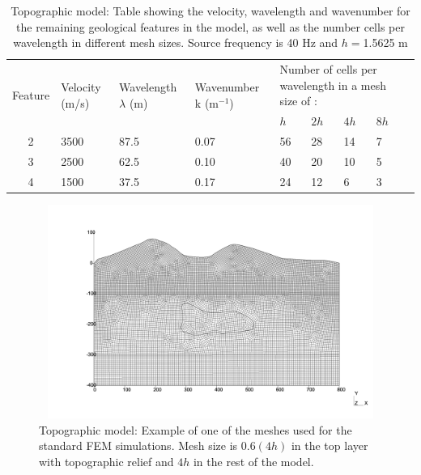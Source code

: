\begin{table}[h!]
\footnotesize
\centering
    \begin{tabular}{|c|m{1.5cm}|m{2cm}|m{2cm}|m{1cm}| m{0.8cm}|m{0.8cm}|m{0.8cm}|m{0.8cm}|}
      \hline
      \multirow{2}{*}{Feature} &
      \multirow{2}{1.5cm}{Velocity (m/s)} &
      \multirow{2}{2cm}{Wavelength \quad $\lambda$ (m)} &
      \multirow{2}{2cm}{Wavenumber  k (m$^{-1}$)} &
         \multicolumn{4}{m{5cm}|}{Number of cells per wavelength in a mesh size of :} \\
         & & &  & $h$ & $2h$ & $4h$ & $8h$ \\
      \hline
      2 & 3500 & 87.5 & 0.07 & 56 & 28 & 14 & 7\\
      \hline
      3 & 2500 & 62.5 & 0.10 & 40 & 20 & 10 & 5\\
      \hline
      4 & 1500 & 37.5 & 0.17 & 24 & 12 & 6 & 3\\
       \hline
    \end{tabular}
    \caption{Topographic model: Table showing the velocity, wavelength and wavenumber for the remaining geological features in the model, as well as the number cells per wavelength in different mesh sizes. Source frequency is 40 Hz and $h=$1.5625 m}
    \label{table:3.4}
\end{table}
 \begin{figure}[h!]
	\centering
	\includegraphics[width=14cm, height=7cm]{Thesis_Edith/figures/topo/topo_mesh_4hv2.pdf}
	\caption{Topographic model: Example of one of the meshes used for the standard FEM simulations. Mesh size is $0.6 (4h)$ in the top layer with topographic relief and $4h$ in the rest of the model.}
	\label{fig:3.38}
\end{figure}

